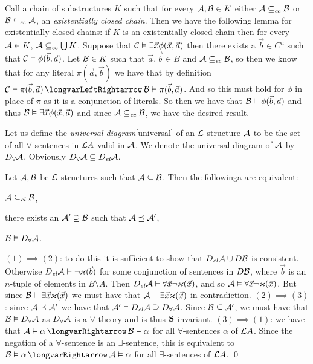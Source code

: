 Call a chain of substructures $K$ such that for every ${\cal A},{\cal B}\in K$ either ${\cal A}\subseteq_{\it ec}{\cal B}$ or ${\cal B}\subseteq_{\it ec}{\cal A}$, an {\it existentially closed chain}.
Then we have the following lemma for existentially closed chains: if $K$ is an existentially closed chain then for every ${\cal A}\in K$, ${\cal A}\subseteq_{\it ec}\bigcup K$.
Suppose that ${\cal C}\vDash\exists\vec x\phi(\vec x,\vec a)$ then there exists a $\vec b\in C^n$ such that ${\cal C}\vDash\phi(\vec b,\vec a)$.
Let ${\cal B}\in K$ such that $\vec a,\vec b\in B$ and ${\cal A}\subseteq_{\it ec}{\cal B}$, so then we know that for any literal $\pi(\vec a,\vec b)$ we have that by definition
${\cal C}\vDash\pi(\vec b,\vec a)\iff{\cal B}\vDash\pi(\vec b,\vec a)$.
And so this must hold for $\phi$ in place of $\pi$ as it is a conjunction of literals.
So then we have that ${\cal B}\vDash\phi(\vec b,\vec a)$ and thus ${\cal B}\vDash\exists\vec x\phi(\vec x,\vec a)$ and since ${\cal A}\subseteq_{\it ec}{\cal B}$, we have the desired result.

Let us define the {\it universal diagram}[universal] of an ${\cal L}$-structure ${\cal A}$ to be the set of all $\forall$-sentences in ${\cal L}A$ valid in ${\cal A}$.
We denote the universal diagram of ${\cal A}$ by $D_\forall{\cal A}$.
Obviously $D_\forall{\cal A}\subseteq D_{\it el}{\cal A}$.

\blemm[name=eclosureequiv]

    Let ${\cal A},{\cal B}$ be ${\cal L}$-structures such that ${\cal A}\subseteq{\cal B}$.
    Then the followinga are equivalent:
    \benum
        \item ${\cal A}\subseteq_{\it el}{\cal B}$,
        \item there exists an ${\cal A}'\supseteq{\cal B}$ such that ${\cal A}\preceq{\cal A}'$,
        \item ${\cal B}\vDash D_\forall{\cal A}$.
    \eenum

\elemm

$(1)\implies(2)$: to do this it is sufficient to show that $D_{\it el}{\cal A}\cup D{\cal B}$ is consistent.
Otherwise $D_{\it el}{\cal A}\vdash\neg\varkappa(\vec b)$ for some conjunction of sentences in $D{\cal B}$, where $\vec b$ is an $n$-tuple of elements in $B\setminus A$.
Then $D_{\it el}{\cal A}\vdash\forall\vec x\neg\varkappa(\vec x)$, and so ${\cal A}\vDash\forall\vec x\neg\varkappa(\vec x)$.
But since ${\cal B}\vDash\exists\vec x\varkappa(\vec x)$ we must have that ${\cal A}\vDash\exists\vec x\varkappa(\vec x)$ in contradiction.
$(2)\implies(3)$: since ${\cal A}\preceq{\cal A}'$ we have that ${\cal A}'\vDash D_{\it el}{\cal A}\supseteq D_\forall{\cal A}$.
Since ${\cal B}\subseteq{\cal A}'$, we must have that ${\cal B}\vDash D_\forall{\cal A}$ as $D_\forall{\cal A}$ is a $\forall$-theory and is thus ${\bf S}$-invariant.
$(3)\implies(1)$: we have that ${\cal A}\vDash\alpha\implies{\cal B}\vDash\alpha$ for all $\forall$-sentences $\alpha$ of ${\cal L}A$.
Since the negation of a $\forall$-sentence is an $\exists$-sentence, this is equivalent to ${\cal B}\vDash\alpha\implies{\cal A}\vDash\alpha$ for all $\exists$-sentences of ${\cal L}A$.
\qed

